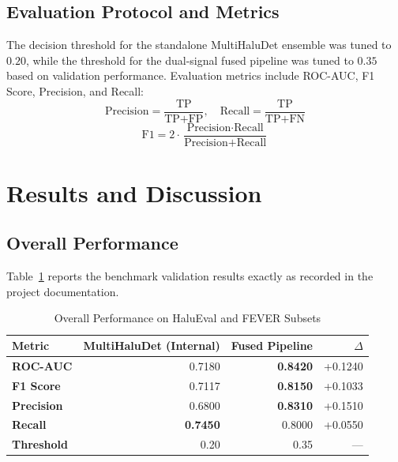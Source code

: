 \documentclass[conference]{IEEEtran}
\begin{document}
\subsection{Evaluation Protocol and Metrics}
The decision threshold for the standalone MultiHaluDet ensemble was tuned to $0.20$, while the threshold for the dual-signal fused pipeline was tuned to $0.35$ based on validation performance. Evaluation metrics include ROC-AUC, F1 Score, Precision, and Recall:
\begin{equation}
\text{Precision} = \frac{\text{TP}}{\text{TP} + \text{FP}}, \quad \text{Recall} = \frac{\text{TP}}{\text{TP} + \text{FN}}
\end{equation}
\begin{equation}
\text{F1} = 2 \cdot \frac{\text{Precision} \cdot \text{Recall}}{\text{Precision} + \text{Recall}}
\end{equation}

\section{Results and Discussion}

\subsection{Overall Performance}
Table~\ref{tab:results} reports the benchmark validation results exactly as recorded in the project documentation.

\begin{table}[htbp]
\caption{Overall Performance on HaluEval and FEVER Subsets}
\begin{center}
\begin{tabular}{lrrr}
\toprule
\textbf{Metric} & \textbf{MultiHaluDet (Internal)} & \textbf{Fused Pipeline} & \textbf{$\Delta$} \\
\midrule
\textbf{ROC-AUC} & 0.7180 & \textbf{0.8420} & +0.1240 \\
\textbf{F1 Score} & 0.7117 & \textbf{0.8150} & +0.1033 \\
\textbf{Precision} & 0.6800 & \textbf{0.8310} & +0.1510 \\
\textbf{Recall} & \textbf{0.7450} & 0.8000 & +0.0550 \\
\textbf{Threshold} & 0.20 & 0.35 & --- \\
\bottomrule
\end{tabular}
\label{tab:results}
\end{center}
\end{table}
\end{document}

